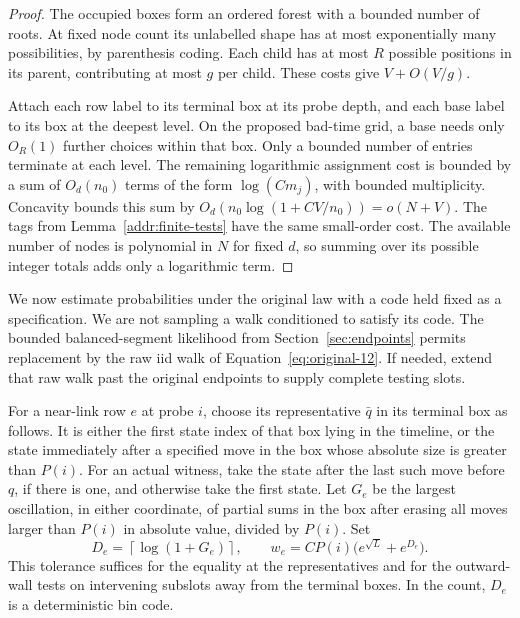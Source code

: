 \begin{proof}
The occupied boxes form an ordered forest with a bounded number of
roots.  At fixed node count its unlabelled shape has at most
exponentially many possibilities, by parenthesis coding.  Each child
has at most $R$ possible positions in its parent, contributing at
most $g$ per child.  These costs give $V+O(V/g)$.

Attach each row label to its terminal box at its probe depth, and
each base label to its box at the deepest level.  On the proposed
bad-time grid, a base needs only $O_R(1)$ further choices within that
box.  Only a bounded number of entries terminate at each level.  The
remaining logarithmic assignment cost is bounded by a sum of
$O_d(n_0)$ terms of the form $\log(Cm_j)$, with bounded
multiplicity.  Concavity bounds this sum by
$O_d(n_0\log(1+C V/n_0))=o(N+V)$.  The tags from
Lemma~\ref{addr:finite-tests} have the same small-order cost.  The
available number of nodes is polynomial in $N$ for fixed $d$, so
summing over its possible integer totals adds only a logarithmic term.
\end{proof}

We now estimate probabilities under the original law with a code held
fixed as a specification.  We are not sampling a walk conditioned to
satisfy its code.  The bounded balanced-segment likelihood from
Section~\ref{sec:endpoints} permits replacement by the raw iid walk
of Equation~\eqref{eq:original-12}.  If needed, extend that raw walk
past the original endpoints to supply complete testing slots.

For a near-link row $e$ at probe $i$, choose its representative
$\bar q$ in its terminal box as follows.  It is either the first
state index of that box lying in the timeline, or the state immediately
after a specified move in the box whose absolute size is greater than
$P(i)$.  For an actual witness, take the state after the last such
move before $q$, if there is one, and otherwise take the first state.
Let $G_e$ be the largest oscillation, in either coordinate, of partial
sums in the box after erasing all moves larger than $P(i)$ in
absolute value, divided by $P(i)$.  Set
\begin{equation}\label{addr:row-tolerance}
 D_e=\left\lceil\log(1+G_e)\right\rceil,
 \qquad w_e=CP(i)\bigl(e^{\sqrt L}+e^{D_e}\bigr).
\end{equation}
This tolerance suffices for the equality at the representatives and
for the outward-wall tests on intervening subslots away from the
terminal boxes.  In the count, $D_e$ is a deterministic bin code.

